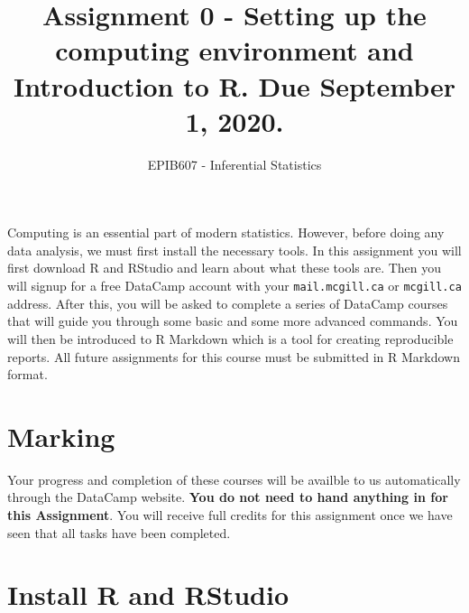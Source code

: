 \documentclass[letterpaper,12pt,twoside,]{pinp}
\title{Assignment 0 - Setting up the computing environment and Introduction to
R. Due September 1, 2020.}
\author[a]{EPIB607 - Inferential Statistics}
\affil[a]{Fall 2020, McGill University}
\begin{document}
\verticaladjustment{-2pt}

\maketitle
\thispagestyle{firststyle}



\tableofcontents

\vspace*{1in}

Computing is an essential part of modern statistics. However, before
doing any data analysis, we must first install the necessary tools. In
this assignment you will first download R and RStudio and learn about
what these tools are. Then you will signup for a free DataCamp account
with your \texttt{mail.mcgill.ca} or \texttt{mcgill.ca} address. After
this, you will be asked to complete a series of DataCamp courses that
will guide you through some basic and some more advanced commands. You
will then be introduced to R Markdown which is a tool for creating
reproducible reports. All future assignments for this course must be
submitted in R Markdown format.

\newpage

\hypertarget{marking}{%
\section{Marking}\label{marking}}

Your progress and completion of these courses will be availble to us
automatically through the DataCamp website. \textbf{You do not need to
hand anything in for this Assignment}. You will receive full credits for
this assignment once we have seen that all tasks have been completed.

\hypertarget{install-r-and-rstudio}{%
\section{Install R and RStudio}\label{install-r-and-rstudio}}
\end{document}
